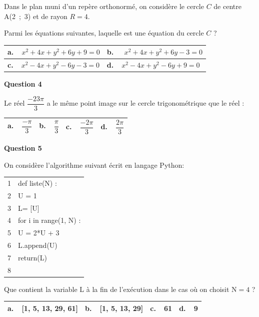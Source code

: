 Dans le plan muni d'un repère orthonormé, on considère le cercle $C$ de centre A(2~;~3) et de rayon $R = 4$.

Parmi les équations suivantes, laquelle est une équation du cercle $C$ ?

\begin{center}
\begin{tabularx}{\linewidth}{|*{2}{X|}}\hline
\textbf{a.~~}$x^2 + 4x + y^2 + 6y + 9 = 0$&\textbf{b.~~} $x^2 + 4x + y^2 + 6y - 3 = 0$\\ \hline
\textbf{c.~~}$x^2 - 4x + y^2 - 6y - 3 = 0$&\textbf{d.~~}$x^2 - 4x + y^2 - 6y+ 9=0$\\ \hline
\end{tabularx}
\end{center}

\medskip

\textbf{Question 4}

\medskip

Le réel $\dfrac{- 23\pi}{3}$ a le même point image sur le cercle trigonométrique que le réel :

\begin{center}
\begin{tabularx}{\linewidth}{|*{4}{X|}}\hline
\textbf{a.~~}$\dfrac{-\pi}{3}$ &\textbf{b.~~}$\dfrac{\pi}{3}$&\textbf{c.~~}$\dfrac{-2\pi}{3}$ &\textbf{d.~~}$\dfrac{2\pi}{3}$\rule[-3mm]{0mm}{9mm}\\ \hline
\end{tabularx}
\end{center}

\medskip

\textbf{Question 5}

\medskip

On considère l'algorithme suivant écrit en langage Python:

\begin{center}
\begin{tabular}{|c l}
1& def liste(N) :\\
2&U = 1\\
3&L= [U]\\
4&for i in range(1, N) :\\
5&U = 2*U + 3\\
6&L.append(U)\\ 
7&return(L)\\
8&\\
\end{tabular}
\end{center}

Que contient la variable L à la fin de l'exécution dans le cas où on choisit N$ = 4$ ?

\begin{center}
\begin{tabularx}{\linewidth}{|*{4}{X|}}\hline
\textbf{a.~~}[1, 5, 13, 29, 61]&\textbf{b.~~}[1, 5, 13, 29]&\textbf{c.~~}61  &\textbf{d.~~}9\\ \hline
\end{tabularx}
\end{center}

\bigskip
